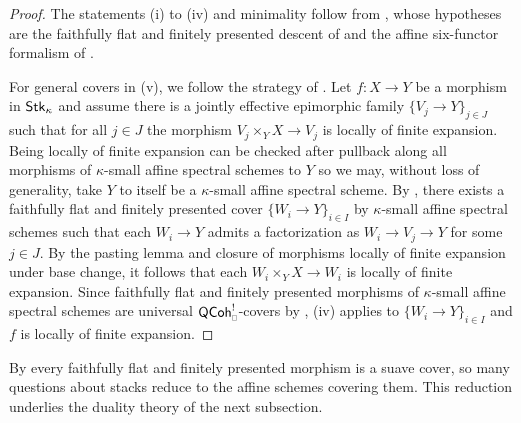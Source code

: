 \begin{proof}
    The statements (i) to (iv) and minimality follow from \cite[Thm. 3.4.11]{HeyerMann6FF}, whose hypotheses are the faithfully flat and finitely presented descent of  and the affine six-functor formalism of .

    For general covers in (v), we follow the strategy of \cite[Thm. 2.7.8 (iii) (b)]{HansenMannCLL}. Let $f:X\to Y$ be a morphism in $\mathsf{Stk}_{\kappa}$ and assume there is a jointly effective epimorphic family $\{V_{j}\to Y\}_{j\in J}$ such that for all $j\in J$ the morphism $V_{j}\times_{Y}X\to V_{j}$ is locally of finite expansion. Being locally of finite expansion can be checked after pullback along all morphisms of $\kappa$-small affine spectral schemes to $Y$ so we may, without loss of generality, take $Y$ to itself be a $\kappa$-small affine spectral scheme. By \cite[Lem. A.3.9]{MannRigid6FF}, there exists a faithfully flat and finitely presented cover $\{W_{i}\to Y\}_{i\in I}$ by $\kappa$-small affine spectral schemes such that each $W_{i}\to Y$ admits a factorization as $W_{i}\to V_{j}\to Y$ for some $j\in J$. By the pasting lemma and closure of morphisms locally of finite expansion under base change, it follows that each $W_{i}\times_{Y}X\to W_{i}$ is locally of finite expansion. Since faithfully flat and finitely presented morphisms of $\kappa$-small affine spectral schemes are universal $\QCoh^{!}_{\sld}$-covers by , (iv) applies to $\{W_{i}\to Y\}_{i\in I}$ and $f$ is locally of finite expansion.
\end{proof}
By  every faithfully flat and finitely presented morphism is a suave cover, so many questions about stacks reduce to the affine schemes covering them. This reduction underlies the duality theory of the next subsection.
